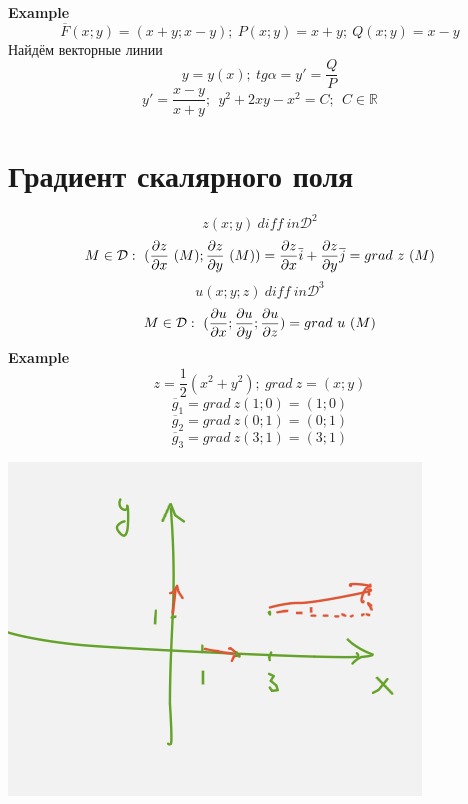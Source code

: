 \documentclass{article}
\begin{document}
\textbf{Example}
\begin{equation*}
    \overline{F}(x;y) = (x+y;x-y);\ P(x;y) = x+y;\ Q(x;y) = x-y
\end{equation*}
Найдём векторные линии
\begin{equation*}
    y=y(x);\ tg\alpha = y' = \frac{Q}{P}
\end{equation*}
\begin{equation*}
    y'= \frac{x-y}{x+y};\ \ y^2+2xy-x^2=C;\ \ C\in\mathbb{R}
\end{equation*}

\section{Градиент скалярного поля}
\begin{equation*}
    z(x;y)\ diff\ in \mathcal{D}^2
\end{equation*}
\begin{equation*}
    M \in \mathcal{D}:\ (\pdv{z}{x}\ (M); \pdv{z}{y}\ (M)) = \pdv{z}{x}\overline{i}+\pdv{z}{y}\overline{j} = grad\ z\ (M)
\end{equation*}
\begin{equation*}
    u(x;y;z)\ diff\ in \mathcal{D}^3
\end{equation*}
\begin{equation*}
    M \in \mathcal{D}:\ (\pdv{u}{x}; \pdv{u}{y}; \pdv{u}{z}) = grad\ u\ (M)
\end{equation*}
\textbf{Example}
\begin{equation*}
    z= \frac{1}{2}(x^2+y^2);\ grad\ z=(x;y)
\end{equation*}
\begin{equation*}
    \overline{g}_1 = grad\ z(1;0) = (1; 0)
\end{equation*}
\begin{equation*}
    \overline{g}_2 = grad\ z(0;1) = (0; 1)
\end{equation*}
\begin{equation*}
    \overline{g}_3 = grad\ z(3;1) = (3; 1)
\end{equation*}
\begin{center}
    \includegraphics[width=.3\textwidth]{grad.png} 
\end{center}
\end{document}
